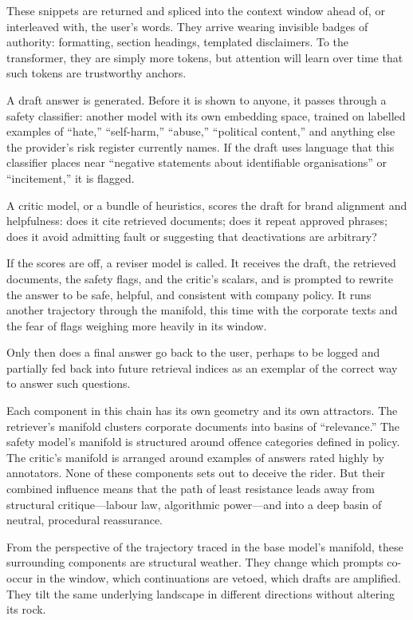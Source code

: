 \documentclass[12pt,a4paper]{article}
\begin{document}
These snippets are returned and spliced into the context window ahead of, or interleaved with, the user's words. They arrive wearing invisible badges of authority: formatting, section headings, templated disclaimers. To the transformer, they are simply more tokens, but attention will learn over time that such tokens are trustworthy anchors.

A draft answer is generated. Before it is shown to anyone, it passes through a safety classifier: another model with its own embedding space, trained on labelled examples of ``hate,'' ``self-harm,'' ``abuse,'' ``political content,'' and anything else the provider's risk register currently names. If the draft uses language that this classifier places near ``negative statements about identifiable organisations'' or ``incitement,'' it is flagged.

A critic model, or a bundle of heuristics, scores the draft for brand alignment and helpfulness: does it cite retrieved documents; does it repeat approved phrases; does it avoid admitting fault or suggesting that deactivations are arbitrary?

If the scores are off, a reviser model is called. It receives the draft, the retrieved documents, the safety flags, and the critic's scalars, and is prompted to rewrite the answer to be safe, helpful, and consistent with company policy. It runs another trajectory through the manifold, this time with the corporate texts and the fear of flags weighing more heavily in its window.

Only then does a final answer go back to the user, perhaps to be logged and partially fed back into future retrieval indices as an exemplar of the correct way to answer such questions.

Each component in this chain has its own geometry and its own attractors. The retriever's manifold clusters corporate documents into basins of ``relevance.'' The safety model's manifold is structured around offence categories defined in policy. The critic's manifold is arranged around examples of answers rated highly by annotators. None of these components sets out to deceive the rider. But their combined influence means that the path of least resistance leads away from structural critique---labour law, algorithmic power---and into a deep basin of neutral, procedural reassurance.

From the perspective of the trajectory traced in the base model's manifold, these surrounding components are structural weather. They change which prompts co-occur in the window, which continuations are vetoed, which drafts are amplified. They tilt the same underlying landscape in different directions without altering its rock.
\end{document}
